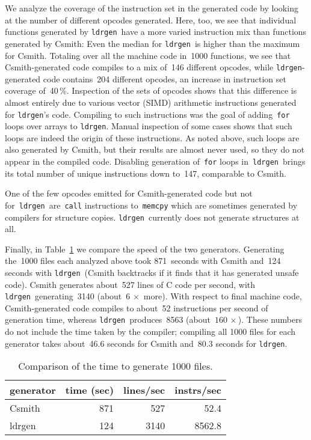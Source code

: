 \documentclass{llncs}
\newcommand\ldrgen{\texttt{ldrgen}}
\begin{document}
We analyze the coverage of the instruction set in the generated
code by looking at the number of different opcodes generated. Here, too, we
see that individual functions generated by \ldrgen\ have a more varied
instruction mix than functions generated by Csmith: Even the median for
\ldrgen\ is higher than the maximum for Csmith. Totaling over all the
machine code in~1000 functions, we see that Csmith-generated code compiles
to a mix of~146 different opcodes, while \ldrgen-generated code contains~204
different opcodes, an increase in instruction set coverage of~40\,\%.
Inspection of the sets of opcodes shows that this difference is almost
entirely due to various vector (SIMD) arithmetic instructions generated for
\ldrgen's code. Compiling to such instructions was the goal of
adding~\verb|for| loops over arrays to \ldrgen. Manual inspection of some
cases shows that such loops are indeed the origin of these instructions.
As noted above, such loops are also generated by Csmith, but their results
are almost never used, so they do not appear in the compiled code.
Disabling generation of~\verb|for| loops in~\ldrgen\ brings its total number
of unique instructions down to~147, comparable to Csmith.

One of the few opcodes emitted for Csmith-generated code but not
for~\ldrgen\ are~\verb|call| instructions to~\verb|memcpy| which are
sometimes generated by compilers for structure copies. \ldrgen\ currently
does not generate structures at all.

Finally, in Table~\ref{tab:timings} we compare the speed of the two
generators. Generating the~1000
files each analyzed above took 871~seconds with Csmith and~124 seconds with
\ldrgen\ (Csmith backtracks if it finds that it has generated unsafe code).
Csmith generates about~527 lines of C code per second, with \ldrgen\
generating~3140 (about~\(6\,\times\) more). With respect to final machine
code, Csmith-generated code compiles to about~52 instructions per second of
generation time, whereas \ldrgen\ produces~8563 (about~\(160\,\times\)).
%
These numbers do not include the time taken by the compiler; compiling all
1000 files for each generator takes about~46.6 seconds for Csmith and~80.3
seconds for \ldrgen.

\begin{table}
\caption{Comparison of the time to generate 1000 files.}
\label{tab:timings}
\centering
\begin{tabular}{l@{\ } | @{\ }r@{\quad}r@{\quad}r}
    generator & time (sec) & lines/sec & instrs/sec \\
    \hline
    Csmith & 871 &  527 & 52.4 \\
    ldrgen & 124 & 3140 & 8562.8
\end{tabular}
\end{table}
\end{document}
